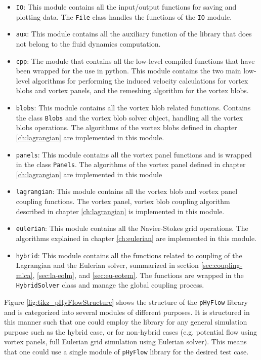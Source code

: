 \begin{itemize}
\item \texttt{IO}: This module contains all the input/output functions for saving and plotting data. The \texttt{File} class handles the functions of the \texttt{IO} module.
\item \texttt{aux}: This module contains all the auxiliary function of the library that does not belong to the fluid dynamics computation.
\item \texttt{cpp}: The module that contains all the low-level compiled functions that have been wrapped for the use in \textsf{python}. This module contains the two main low-level algorithms for performing the induced velocity calculations for vortex blobs and vortex panels, and the remeshing algorithm for the vortex blobs.
\item \texttt{blobs}: This module contains all the vortex blob related functions. Contains the class \texttt{Blobs} and the vortex blob solver object, handling all the vortex blobs operations. The algorithms of the vortex blobs defined in chapter \ref{ch:lagrangian} are implemented in this module.
\item \texttt{panels}: This module contains all the vortex panel functions and is wrapped in the class \texttt{Panels}. The algorithms of the vortex panel defined in chapter \ref{ch:lagrangian} are implemented in this module
\item \texttt{lagrangian}: This module contains all the vortex blob and vortex panel coupling functions. The vortex panel, vortex blob coupling algorithm described in chapter \ref{ch:lagrangian} is implemented in this module.
\item \texttt{eulerian}: This module contains all the Navier-Stokes grid operations. The algorithms explained in chapter \ref{ch:eulerian} are implemented in this module.
\item \texttt{hybrid}: This module contains all the functions related to coupling of the Lagrangian and the Eulerian solver, summarized in section \ref{sec:coupling-mlca}, \ref{sec:la-eolm}, and \ref{sec:eu-eotem}. The functions are wrapped in the \texttt{HybridSolver} class and manage the global coupling process.

\end{itemize}

Figure \ref{fig:tikz_pHyFlowStructure} shows the structure of the \texttt{pHyFlow} library and is categorized into several modules of different purposes. It is structured in this manner such that one could employ the library for any general simulation purpose such as the hybrid case, or for non-hybrid cases (e.g. potential flow using vortex panels, full Eulerian grid simulation using Eulerian solver). This means that one could use a single module of \texttt{pHyFlow} library for the desired test case.

